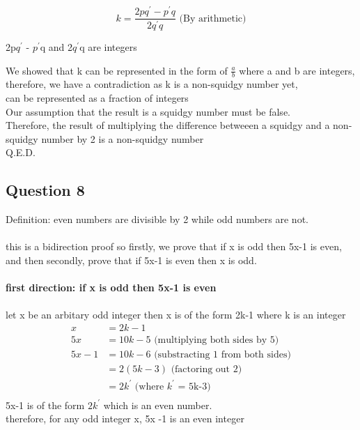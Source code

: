 \documentclass[11pt]{article}
\begin{document}
{{{\noindent
{\begin{displaymath}
    k = \frac{2pq^{\prime} - p^{\prime} q}{2 q^{\prime} q} \text{ (By arithmetic)}
\end{displaymath}
}

\noindent
2p$q^{\prime}$ - $p^{\prime}$q and 2$q^{\prime}$q are integers

\noindent
We showed that k can be represented in the form of $\frac{a}{b}$ where a and b are  integers, \\
therefore, we have a contradiction as k is a non-squidgy number yet, \\
can be represented as a fraction of integers \\
Our assumption that the result is a squidgy number must be false. \\
Therefore, the result of multiplying the difference betweeen a squidgy and a
non-squidgy number by 2 is a non-squidgy number \\
Q.E.D.

\subsection*{Question 8}
Definition: even numbers are divisible by 2 while odd numbers are not. \\ \\
this is a bidirection proof so firstly, we prove that if x is odd
then 5x-1 is even, \\
and then secondly, prove that if 5x-1 is even then x is odd. \\
\\
\textbf{first direction: if x is odd then 5x-1 is even} \\
\\
let x be an arbitary odd integer then x is of the form 2k-1
where k is an integer \\
\begin{align*}
    x &= 2k-1 \\
    5x &= 10k - 5 \text{  (multiplying both sides by 5)} \\
    5x - 1 &= 10k - 6 \text{  (substracting 1 from both sides)} \\
    &=2(5k - 3) \text{  (factoring out 2)} \\
    &=2 k^{\prime} \text{  (where $k^{\prime}$ = 5k-3)} \\
\end{align*}
5x-1 is of the form $2 k^{\prime}$ which is an even number.\\
therefore, for any odd integer x, 5x -1 is an even integer

}}}
\end{document}
